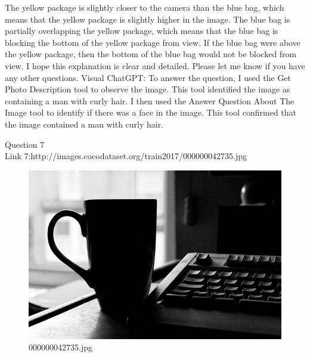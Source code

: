 \begin{enumerate}
        The yellow package is slightly closer to the camera than the blue bag, which means that the yellow package is slightly higher in the image.
        The blue bag is partially overlapping the yellow package, which means that the blue bag is blocking the bottom of the yellow package from view.
        If the blue bag were above the yellow package, then the bottom of the blue bag would not be blocked from view.
        I hope this explanation is clear and detailed. Please let me know if you have any other questions.
        \subitem Visual ChatGPT: To answer the question, I used the Get Photo Description tool to observe the image. This tool identified the image as containing a man with curly hair. I then used the Answer Question About The Image tool to identify if there was a face in the image. This tool confirmed that the image contained a man with curly hair.
    \end{enumerate}
Question 7\\
Link 7:http://images.cocodataset.org/train2017/000000042735.jpg
    \begin{figure}[h]
        \centering
        \includegraphics[width=0.8\linewidth]{../image set/easy/000000042735.jpg}
        \caption{000000042735.jpg}
    \end{figure}
